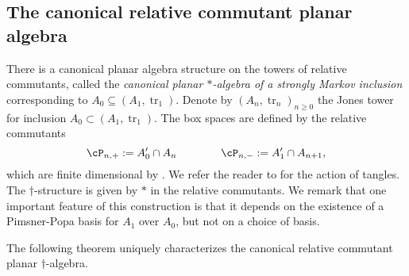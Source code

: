\documentclass[11pt]{article}
\theoremstyle{plain}
\theoremstyle{definition}
\DeclareMathOperator{\tr}{tr}
\begin{document}
\subsection{The canonical relative commutant planar algebra}%
\label{sec:StronglyMarkovPA}
\label{ssec:canonical}


There is a canonical planar algebra structure on the towers of relative commutants, called the \textit{canonical planar $\ast$-algebra of a strongly Markov inclusion} corresponding to $A_0\subseteq (A_1,\tr_1)$. 
Denote by $(A_n,\tr_n)_{n\geq 0}$ the Jones tower for inclusion $A_0\subset (A_1,\tr_1)$.
The box spaces are defined by the relative commutants
$$
\cP_{n,+}:=A_0'\cap A_{n} 
\qquad\qquad
\cP_{n,-}:=A_1'\cap A_{n+1},
$$
which are finite dimensional by \cite[Prop.~2.7.3]{MR996807}.
We refer the reader to \cite[\S2.3]{MR2812459} for the action of tangles.
The $\dag$-structure is given by $*$ in the relative commutants. 
We remark that one important feature of this construction is that it depends on the existence of a Pimsner-Popa basis for $A_1$ over $A_0$, but not on a choice of basis. 

The following theorem uniquely characterizes the canonical relative commutant planar $\dag$-algebra.
\end{document}
